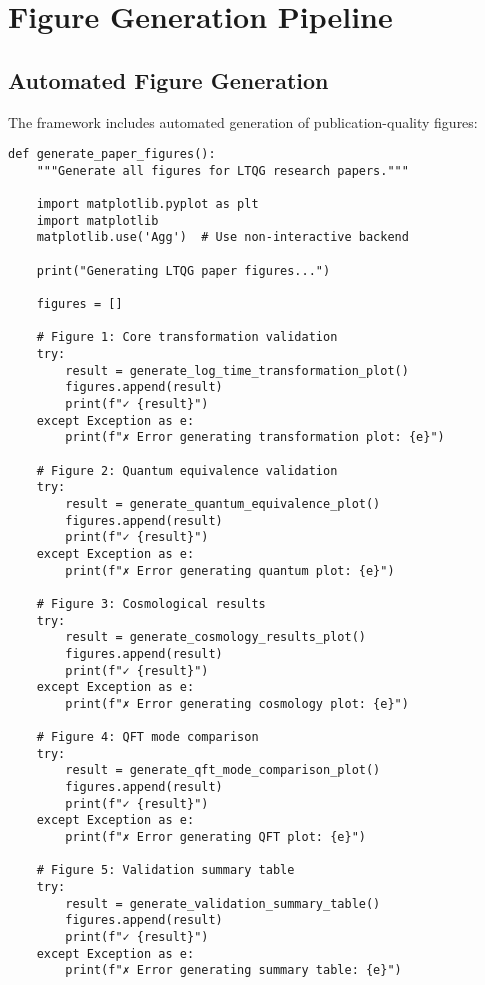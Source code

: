 \documentclass[11pt,a4paper]{article}
\theoremstyle{definition}
\theoremstyle{remark}
\begin{document}
\section{Figure Generation Pipeline}

\subsection{Automated Figure Generation}

The framework includes automated generation of publication-quality figures:

\begin{lstlisting}
def generate_paper_figures():
    """Generate all figures for LTQG research papers."""
    
    import matplotlib.pyplot as plt
    import matplotlib
    matplotlib.use('Agg')  # Use non-interactive backend
    
    print("Generating LTQG paper figures...")
    
    figures = []
    
    # Figure 1: Core transformation validation
    try:
        result = generate_log_time_transformation_plot()
        figures.append(result)
        print(f"✓ {result}")
    except Exception as e:
        print(f"✗ Error generating transformation plot: {e}")
    
    # Figure 2: Quantum equivalence validation
    try:
        result = generate_quantum_equivalence_plot()
        figures.append(result)
        print(f"✓ {result}")
    except Exception as e:
        print(f"✗ Error generating quantum plot: {e}")
    
    # Figure 3: Cosmological results
    try:
        result = generate_cosmology_results_plot()
        figures.append(result)
        print(f"✓ {result}")
    except Exception as e:
        print(f"✗ Error generating cosmology plot: {e}")
    
    # Figure 4: QFT mode comparison
    try:
        result = generate_qft_mode_comparison_plot()
        figures.append(result)
        print(f"✓ {result}")
    except Exception as e:
        print(f"✗ Error generating QFT plot: {e}")
    
    # Figure 5: Validation summary table
    try:
        result = generate_validation_summary_table()
        figures.append(result)
        print(f"✓ {result}")
    except Exception as e:
        print(f"✗ Error generating summary table: {e}")
    

\end{lstlisting}
\end{document}
